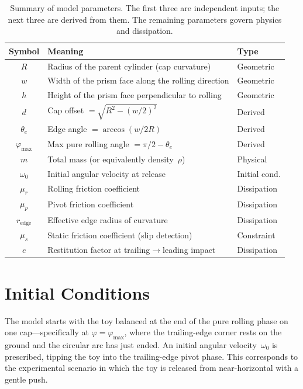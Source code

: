 \documentclass[11pt,a4paper]{article}
\theoremstyle{plain}
\theoremstyle{definition}
\theoremstyle{remark}
\begin{document}
\begin{table}[H]
\centering
\renewcommand{\arraystretch}{1.3}
\begin{tabular}{@{} c l l @{}}
\toprule
\textbf{Symbol} & \textbf{Meaning} & \textbf{Type} \\
\midrule
$R$        & Radius of the parent cylinder (cap curvature) & Geometric \\
$w$        & Width of the prism face along the rolling direction & Geometric \\
$h$        & Height of the prism face perpendicular to rolling & Geometric \\
\midrule
$d$        & Cap offset $= \sqrt{R^2 - (w/2)^2}$ & Derived \\
$\theta_e$ & Edge angle $= \arccos(w/2R)$ & Derived \\
$\varphi_{\max}$ & Max pure rolling angle $= \pi/2 - \theta_e$ & Derived \\
\midrule
$m$        & Total mass (or equivalently density~$\rho$) & Physical \\
$\omega_0$ & Initial angular velocity at release & Initial cond. \\
$\mu_r$    & Rolling friction coefficient & Dissipation \\
$\mu_p$    & Pivot friction coefficient & Dissipation \\
$r_{\mathrm{edge}}$ & Effective edge radius of curvature & Dissipation \\
$\mu_s$    & Static friction coefficient (slip detection) & Constraint \\
$e$        & Restitution factor at trailing$\to$leading impact & Dissipation \\
\bottomrule
\end{tabular}
\caption{Summary of model parameters.  The first three are independent inputs; the next three are derived from them.  The remaining parameters govern physics and dissipation.}
\label{tab:parameters}
\end{table}


\section{Initial Conditions}
\label{sec:initial}

The model starts with the toy balanced at the end of the pure rolling phase
on one cap---specifically at $\varphi = \varphi_{\max}$, where the trailing-edge
corner rests on the ground and the circular arc has just ended. An initial angular
velocity~$\omega_0$ is prescribed, tipping the toy into the trailing-edge pivot
phase. This corresponds to the experimental scenario in which the toy is released
from near-horizontal with a gentle push.
\end{document}
